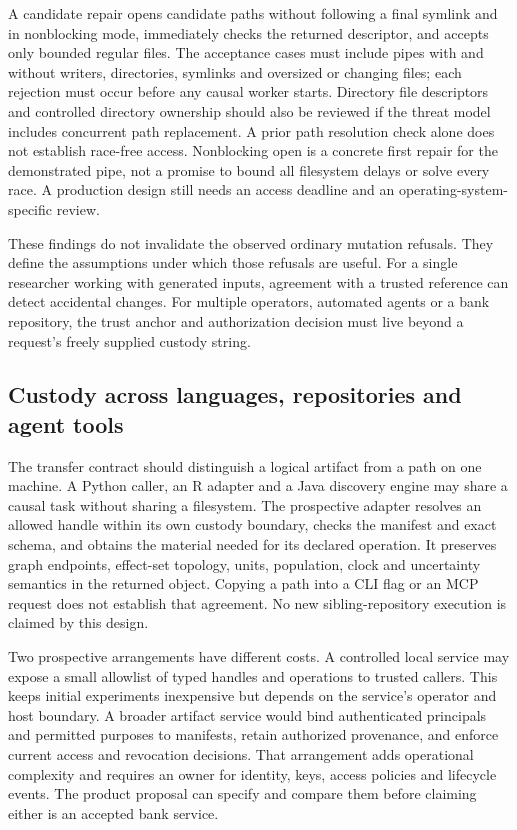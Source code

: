 A candidate repair opens candidate paths without following a final
symlink and in nonblocking mode, immediately checks the returned
descriptor, and accepts only bounded regular files. The acceptance cases
must include pipes with and without writers, directories, symlinks and
oversized or changing files; each rejection must occur before any causal
worker starts. Directory file descriptors and controlled directory
ownership should also be reviewed if the threat model includes
concurrent path replacement. A prior path resolution check alone does
not establish race-free access. Nonblocking open is a concrete first
repair for the demonstrated pipe, not a promise to bound all filesystem
delays or solve every race. A production design still needs an access
deadline and an operating-system-specific review.
\citep{exec14_custody_design}

These findings do not invalidate the observed ordinary mutation
refusals. They define the assumptions under which those refusals are
useful. For a single researcher working with generated inputs, agreement
with a trusted reference can detect accidental changes. For multiple
operators, automated agents or a bank repository, the trust anchor and
authorization decision must live beyond a request's freely supplied
custody string.

\hypertarget{custody-across-languages-repositories-and-agent-tools}{%
\subsection{Custody across languages, repositories and agent
tools}\label{custody-across-languages-repositories-and-agent-tools}}

The transfer contract should distinguish a logical artifact from a path
on one machine. A Python caller, an R adapter and a Java discovery
engine may share a causal task without sharing a filesystem. The
prospective adapter resolves an allowed handle within its own custody
boundary, checks the manifest and exact schema, and obtains the material
needed for its declared operation. It preserves graph endpoints,
effect-set topology, units, population, clock and uncertainty semantics
in the returned object. Copying a path into a CLI flag or an MCP request
does not establish that agreement. No new sibling-repository execution
is claimed by this design. \citep{exec14_custody_design}

Two prospective arrangements have different costs. A controlled local
service may expose a small allowlist of typed handles and operations to
trusted callers. This keeps initial experiments inexpensive but depends
on the service's operator and host boundary. A broader artifact service
would bind authenticated principals and permitted purposes to manifests,
retain authorized provenance, and enforce current access and revocation
decisions. That arrangement adds operational complexity and requires an
owner for identity, keys, access policies and lifecycle events. The
product proposal can specify and compare them before claiming either is
an accepted bank service.

